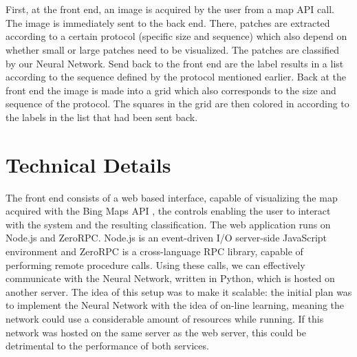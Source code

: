 \documentclass[a4paper,onecolumn]{report}
\begin{document}
\\\\
First, at the front end, an image is acquired by the user from a map API call. The image is immediately sent to the back end. There, patches are extracted according to a certain protocol (specific size and sequence) which also depend on whether small or large patches need to be visualized. The patches are classified by our Neural Network. Send back to the front end are the label results in a list according to the sequence defined by the protocol mentioned earlier. Back at the front end the image is made into a grid which also corresponds to the size and sequence of the protocol. The squares in the grid are then colored in according to the labels in the list that had been sent back.

\section{Technical Details}
The front end consists of a web based interface, capable of visualizing the map acquired with the Bing Maps API \cite{bing}, the controls enabling the user to interact with the system and the resulting classification. The web application runs on Node.js and ZeroRPC. Node.js is an event-driven I/O server-side JavaScript environment and ZeroRPC is a cross-language RPC library, capable of performing remote procedure calls. Using these calls, we can effectively communicate with the Neural Network, written in Python, which is hosted on another server. The idea of this setup was to make it scalable: the initial plan was to implement the Neural Network with the idea of on-line learning, meaning the network could use a considerable amount of resources while running. If this network was hosted on the same server as the web server, this could be detrimental to the performance of both services.
\end{document}
